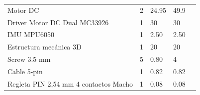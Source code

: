 \begin{table}[H]
\begin{tabular}{|l|l|l|l|l}
		Motor DC                                                        & 2                                         & 24.95                                                                                                               & 49.9                                                                                                             &  \\ \cline{1-4}
		Driver Motor DC Dual MC33926                                    & 1                                         & 30                                                                                                                  & 30                                                                                                               &  \\ \cline{1-4}
		IMU MPU6050                                                     & 1                                         & 2.50                                                                                                                & 2.50                                                                                                             &  \\ \cline{1-4}
		Estructura mecánica 3D                                          & 1                                         & 20                                                                                                                  & 20                                                                                                               &  \\ \cline{1-4}
		Screw 3.5 mm                                                    & 5                                         & 0.80                                                                                                                & 4                                                                                                                &  \\ \cline{1-4}
		Cable 5-pin                                                     & 1                                         & 0.82                                                                                                                & 0.82                                                                                                             &  \\ \cline{1-4}
		Regleta PIN 2,54 mm 4 contactos Macho                           & 1                                         & 0.08                                                                                                                & 0.08                                                                                                             &  \\ \cline{1-4}

\end{tabular}
\end{table}
